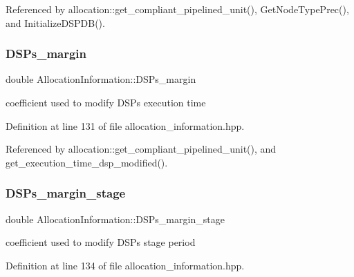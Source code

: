Referenced by allocation\+::get\+\_\+compliant\+\_\+pipelined\+\_\+unit(), Get\+Node\+Type\+Prec(), and Initialize\+D\+S\+P\+D\+B().

\mbox{\label{classAllocationInformation_a024956e0654caf39c60585eb19cd35a3}} 
\subsubsection{\texorpdfstring{D\+S\+Ps\+\_\+margin}{DSPs\_margin}}
{\footnotesize\ttfamily double Allocation\+Information\+::\+D\+S\+Ps\+\_\+margin\hspace{0.3cm}{\ttfamily [private]}}



coefficient used to modify D\+S\+Ps execution time 



Definition at line 131 of file allocation\+\_\+information.\+hpp.



Referenced by allocation\+::get\+\_\+compliant\+\_\+pipelined\+\_\+unit(), and get\+\_\+execution\+\_\+time\+\_\+dsp\+\_\+modified().

\mbox{\label{classAllocationInformation_aae9f2769a604bfa84c9408846ddcad08}} 
\subsubsection{\texorpdfstring{D\+S\+Ps\+\_\+margin\+\_\+stage}{DSPs\_margin\_stage}}
{\footnotesize\ttfamily double Allocation\+Information\+::\+D\+S\+Ps\+\_\+margin\+\_\+stage\hspace{0.3cm}{\ttfamily [private]}}



coefficient used to modify D\+S\+Ps stage period 



Definition at line 134 of file allocation\+\_\+information.\+hpp.



